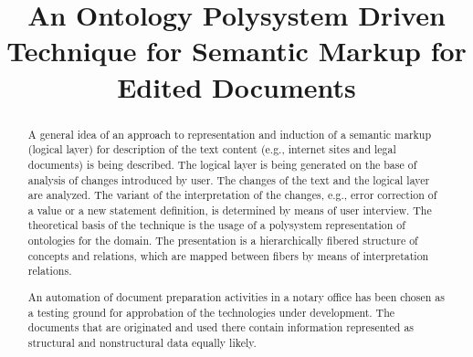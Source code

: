 \documentclass[conference]{IEEEtran}
\begin{document}
\title{An Ontology Polysystem Driven Technique for Semantic Markup
  for Edited Documents} \author{%
}


\maketitle


\begin{abstract}
  A general idea of an approach to representation and induction of a
  semantic markup (logical layer) for description of the text content
  (e.g., internet sites and legal documents) is being described.  The
  logical layer is being generated on the base of analysis of changes
  introduced by user.  The changes of the text and the logical layer
  are analyzed.  The variant of the interpretation of the changes,
  e.g., error correction of a value or a new statement definition, is
  determined by means of user interview.  The theoretical basis of the
  technique is the usage of a polysystem representation of ontologies
  for the domain.  The presentation is a hierarchically fibered
  structure of concepts and relations, which are mapped between fibers
  by means of interpretation relations.

  An automation of document preparation activities in a notary office
  has been chosen as a testing ground for approbation of the
  technologies under development.  The documents that are originated
  and used there contain information represented as structural and
  nonstructural data equally likely.
\end{abstract}


%
\IEEEpeerreviewmaketitle
\end{document}

